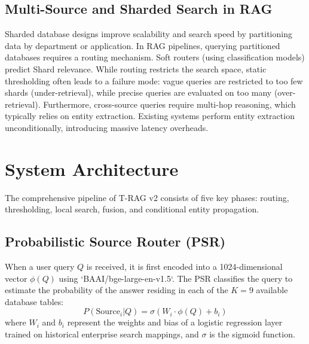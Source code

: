 \documentclass[conference]{IEEEtran}
\begin{document}
\subsection{Multi-Source and Sharded Search in RAG}
Sharded database designs improve scalability and search speed by partitioning data by department or application. In RAG pipelines, querying partitioned databases requires a routing mechanism. Soft routers (using classification models) predict Shard relevance. While routing restricts the search space, static thresholding often leads to a failure mode: vague queries are restricted to too few shards (under-retrieval), while precise queries are evaluated on too many (over-retrieval). Furthermore, cross-source queries require multi-hop reasoning, which typically relies on entity extraction. Existing systems perform entity extraction unconditionally, introducing massive latency overheads.

\section{System Architecture}
The comprehensive pipeline of T-RAG v2 consists of five key phases: routing, thresholding, local search, fusion, and conditional entity propagation.

\subsection{Probabilistic Source Router (PSR)}
When a user query $Q$ is received, it is first encoded into a 1024-dimensional vector $\phi(Q)$ using `BAAI/bge-large-en-v1.5`. The PSR classifies the query to estimate the probability of the answer residing in each of the $K=9$ available database tables:
\begin{equation}
    P(\text{Source}_i | Q) = \sigma(W_i \cdot \phi(Q) + b_i)
\end{equation}
where $W_i$ and $b_i$ represent the weights and bias of a logistic regression layer trained on historical enterprise search mappings, and $\sigma$ is the sigmoid function.
\end{document}
